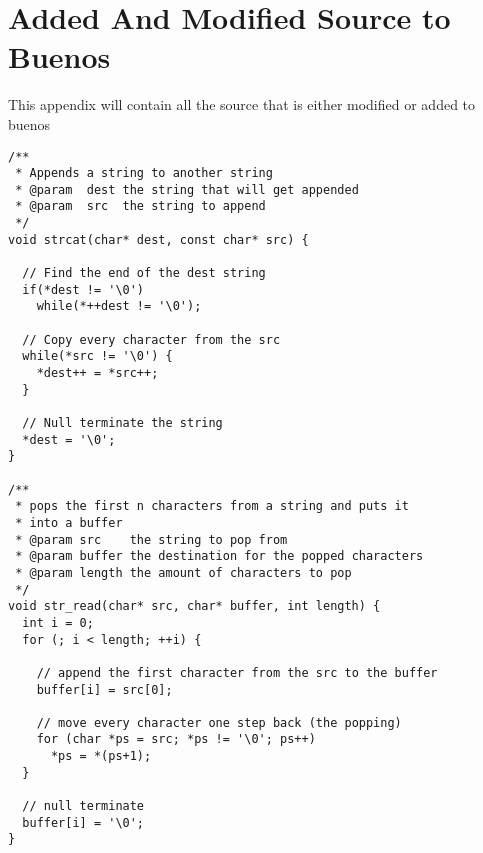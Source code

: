 \documentclass[12pt]{article}
\begin{document}
\newpage

\section{Added And Modified Source to Buenos}

This appendix will contain all the source that is either modified or added to buenos

\begin{lstlisting}[caption=libc.c]
/**
 * Appends a string to another string
 * @param  dest the string that will get appended
 * @param  src  the string to append
 */
void strcat(char* dest, const char* src) {

  // Find the end of the dest string
  if(*dest != '\0')
    while(*++dest != '\0');

  // Copy every character from the src
  while(*src != '\0') {
    *dest++ = *src++;
  }

  // Null terminate the string
  *dest = '\0';
}

/**
 * pops the first n characters from a string and puts it 
 * into a buffer
 * @param src    the string to pop from
 * @param buffer the destination for the popped characters
 * @param length the amount of characters to pop
 */
void str_read(char* src, char* buffer, int length) {
  int i = 0;
  for (; i < length; ++i) {

    // append the first character from the src to the buffer
    buffer[i] = src[0];

    // move every character one step back (the popping)
    for (char *ps = src; *ps != '\0'; ps++)
      *ps = *(ps+1);
  }

  // null terminate
  buffer[i] = '\0';
}
\end{lstlisting}
\end{document}
